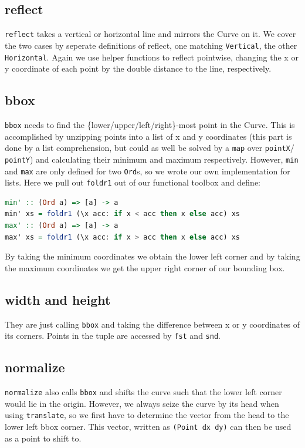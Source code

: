 \documentclass{article}
\begin{document}
\subsection*{reflect}
\texttt{reflect} takes a vertical or horizontal line and mirrors the Curve on it.
We cover the two cases by seperate definitions of reflect, one matching \texttt{Vertical},
the other \texttt{Horizontal}. Again we use helper functions to reflect pointwise,
changing the x or y coordinate of each point by the double distance to the line, respectively.

\subsection*{bbox}
\texttt{bbox} needs to find the \{lower/upper/left/right\}-most point in the Curve.
This is accomplished by unzipping points into a list of x and y coordinates
(this part is done by a list comprehension, but could as well be solved by a \texttt{map}
over \texttt{pointX}/ \texttt{pointY}) and
calculating their minimum and maximum respectively. However, \texttt{min} and \texttt{max}
are only defined for two \texttt{Ord}s, so we wrote our own implementation for lists.
Here we pull out \texttt{foldr1} out of our functional toolbox and define:

\begin{lstlisting}[language=Haskell]
min' :: (Ord a) => [a] -> a
min' xs = foldr1 (\x acc: if x < acc then x else acc) xs
max' :: (Ord a) => [a] -> a
max' xs = foldr1 (\x acc: if x > acc then x else acc) xs
\end{lstlisting}

By taking the minimum coordinates we obtain the lower left corner and by taking
the maximum coordinates we get the upper right corner of our bounding box.

\subsection*{width and height}
They are just calling \texttt{bbox} and taking the difference between x or y
coordinates of its corners. Points in the tuple are accessed by \texttt{fst} and
\texttt{snd}.

\subsection*{normalize}
\texttt{normalize} also calls \texttt{bbox} and shifts the curve such that the 
lower left corner would lie in the origin. However, we always seize the curve
by its head when using \texttt{translate}, so we first have to determine the
vector from the head to the lower left bbox corner. This vector, written as \texttt{(Point dx dy)}
can then be used as a point to shift to.
\end{document}
